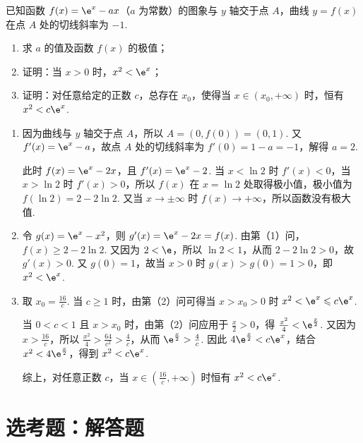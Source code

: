 \begin{problem}
已知函数 \( f(x) = \e^{x} - ax \)（\(a\) 为常数）的图象与 \(y\) 轴交于点 \(A\)，曲线 \(y = f(x)\) 在点 \(A\) 处的切线斜率为 \(-1\).

\begin{enumerate}
\item 求 \(a\) 的值及函数 \(f(x)\) 的极值；
\item 证明：当 \(x > 0\) 时，\(x^2 < \e^{x}\)；
\item 证明：对任意给定的正数 \(c\)，总存在 \(x_0\)，使得当 \(x \in (x_0, +\infty)\) 时，恒有 \(x^2 < c\e^{x}\).
\end{enumerate}
\end{problem}

\begin{solution}
\begin{enumerate}
\item 因为曲线与 \(y\) 轴交于点 \(A\)，所以 \(A=(0,f(0))=(0,1)\). 又 \(f'(x)=\e^x-a\)，故点 \(A\) 处的切线斜率为 \(f'(0)=1-a=-1\)，解得 \(a=2\).

此时 \(f(x)=\e^x-2x\)，且 \(f'(x)=\e^x-2\). 当 \(x<\ln2\) 时 \(f'(x)<0\)，当 \(x>\ln2\) 时 \(f'(x)>0\)，所以 \(f(x)\) 在 \(x=\ln2\) 处取得极小值，极小值为 \(f(\ln2)=2-2\ln2\). 又当 \(x\to\pm\infty\) 时 \(f(x)\to+\infty\)，所以函数没有极大值.

\item 令 \(g(x)=\e^x-x^2\)，则 \(g'(x)=\e^x-2x=f(x)\). 由第（1）问，\(f(x)\geqslant2-2\ln2\). 又因为 \(2<\e\)，所以 \(\ln2<1\)，从而 \(2-2\ln2>0\)，故 \(g'(x)>0\). 又 \(g(0)=1\)，故当 \(x>0\) 时 \(g(x)>g(0)=1>0\)，即 \(x^2<\e^x\).

\item 取 \(x_0=\frac{16}{c}\). 当 \(c\geqslant1\) 时，由第（2）问可得当 \(x>x_0>0\) 时 \(x^2<\e^x\leqslant c\e^x\).

当 \(0<c<1\) 且 \(x>x_0\) 时，由第（2）问应用于 \(\frac{x}{2}>0\)，得 \(\frac{x^2}{4}<\e^{\frac{x}{2}}\). 又因为 \(x>\frac{16}{c}\)，所以 \(\frac{x^2}{4}>\frac{64}{c^2}>\frac{4}{c}\)，从而 \(\e^{\frac{x}{2}}>\frac{4}{c}\). 因此 \(4\e^{\frac{x}{2}}<c\e^x\)，结合 \(x^2<4\e^{\frac{x}{2}}\)，得到 \(x^2<c\e^x\).

综上，对任意正数 \(c\)，当 \(x\in\left(\frac{16}{c},+\infty\right)\) 时恒有 \(x^2<c\e^x\).
\end{enumerate}
\end{solution}

\section{选考题：解答题}

